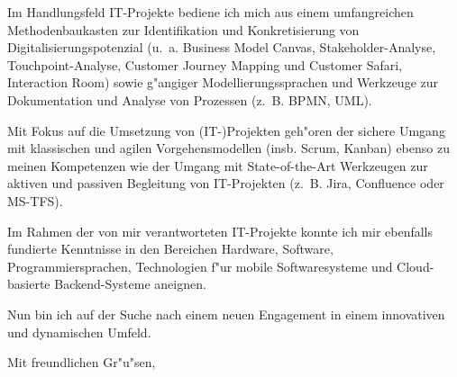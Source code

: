 \documentclass[10pt,a4paper]{dinbrief}
\begin{document}
\begin{letter}
Im Handlungsfeld IT-Projekte bediene ich mich aus einem umfangreichen Methodenbaukasten zur Identifikation und Konkretisierung von Digitalisierungspotenzial (u.~a. Business Model Canvas, Stakeholder-Analyse, Touchpoint-Analyse, Customer Journey Mapping und Customer Safari, Interaction Room) sowie g"angiger Modellierungssprachen und Werkzeuge zur Dokumentation und Analyse von Prozessen (z.~B. BPMN, UML).

Mit Fokus auf die Umsetzung von (IT-)Projekten geh"oren der sichere Umgang mit klassischen und agilen Vorgehensmodellen (insb. Scrum, Kanban) ebenso zu meinen Kompetenzen wie der Umgang mit State-of-the-Art Werkzeugen zur aktiven und passiven Begleitung von IT-Projekten (z.~B. Jira, Confluence oder MS-TFS). 

Im Rahmen der von mir verantworteten IT-Projekte konnte ich mir ebenfalls fundierte Kenntnisse in den Bereichen Hardware, Software, Programmiersprachen, Technologien f"ur mobile Softwaresysteme und Cloud-basierte Backend-Systeme aneignen.

Nun bin ich auf der Suche nach einem neuen Engagement in einem innovativen und dynamischen Umfeld.




\closing{Mit freundlichen Gr"u"sen,}
\end{letter}
\end{document}
